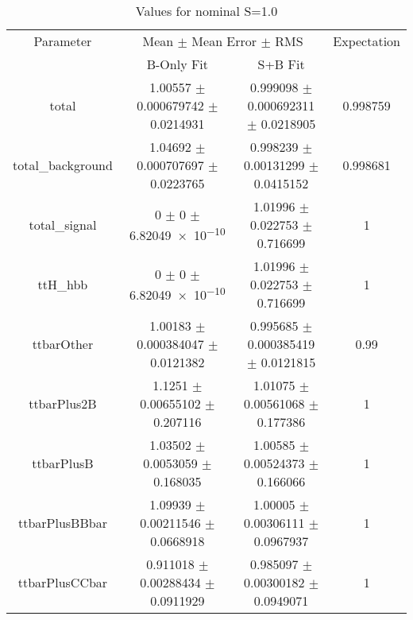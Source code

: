 \begin{table}
\centering
\caption{Values for nominal S=1.0}
\begin{tabular}{cccc}
\toprule
Parameter & \multicolumn{2}{c}{Mean $\pm$ Mean Error $\pm$ RMS} & Expectation\\
 & B-Only Fit & S+B Fit & \\
\midrule
total & \num{1.00557} $\pm$ \num{0.000679742} $\pm$ \num{0.0214931} & \num{0.999098} $\pm$ \num{0.000692311} $\pm$ \num{0.0218905} & \num{0.998759}\\
total\_background & \num{1.04692} $\pm$ \num{0.000707697} $\pm$ \num{0.0223765} & \num{0.998239} $\pm$ \num{0.00131299} $\pm$ \num{0.0415152} & \num{0.998681}\\
total\_signal & \num{0} $\pm$ \num{0} $\pm$ \num{6.82049e-10} & \num{1.01996} $\pm$ \num{0.022753} $\pm$ \num{0.716699} & \num{1}\\
ttH\_hbb & \num{0} $\pm$ \num{0} $\pm$ \num{6.82049e-10} & \num{1.01996} $\pm$ \num{0.022753} $\pm$ \num{0.716699} & \num{1}\\
ttbarOther & \num{1.00183} $\pm$ \num{0.000384047} $\pm$ \num{0.0121382} & \num{0.995685} $\pm$ \num{0.000385419} $\pm$ \num{0.0121815} & \num{0.99}\\
ttbarPlus2B & \num{1.1251} $\pm$ \num{0.00655102} $\pm$ \num{0.207116} & \num{1.01075} $\pm$ \num{0.00561068} $\pm$ \num{0.177386} & \num{1}\\
ttbarPlusB & \num{1.03502} $\pm$ \num{0.0053059} $\pm$ \num{0.168035} & \num{1.00585} $\pm$ \num{0.00524373} $\pm$ \num{0.166066} & \num{1}\\
ttbarPlusBBbar & \num{1.09939} $\pm$ \num{0.00211546} $\pm$ \num{0.0668918} & \num{1.00005} $\pm$ \num{0.00306111} $\pm$ \num{0.0967937} & \num{1}\\
ttbarPlusCCbar & \num{0.911018} $\pm$ \num{0.00288434} $\pm$ \num{0.0911929} & \num{0.985097} $\pm$ \num{0.00300182} $\pm$ \num{0.0949071} & \num{1}\\
\bottomrule
\end{tabular}
\end{table}